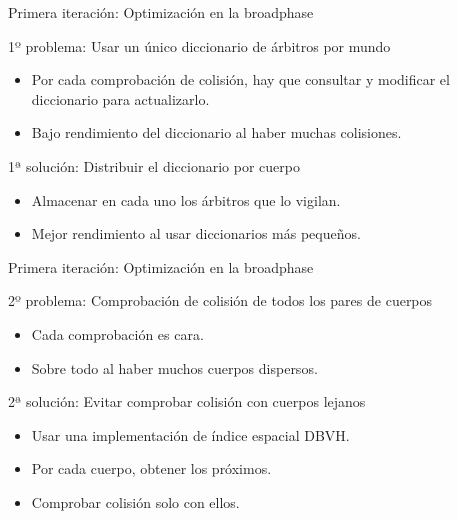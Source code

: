 \documentclass[10pt,xcolor=table]{beamer}
\begin{document}
\begin{frame}{Primera iteración: Optimización en la broadphase}

  \begin{block}{1º problema: Usar un único diccionario de árbitros por mundo}
    \begin{itemize}
    \item Por cada comprobación de colisión, hay que consultar y modificar el diccionario para actualizarlo.
    \item Bajo rendimiento del diccionario al haber muchas colisiones.
    \end{itemize}
  \end{block}

  \begin{exampleblock}{1ª solución: Distribuir el diccionario por cuerpo}
    \begin{itemize}
    \item Almacenar en cada uno los árbitros que lo vigilan.
    \item Mejor rendimiento al usar diccionarios más pequeños.
    \end{itemize}
  \end{exampleblock}
\end{frame}

\begin{frame}{Primera iteración: Optimización en la broadphase}

  \begin{block}{2º problema: Comprobación de colisión de todos los
      pares de cuerpos}
    \begin{itemize}
    \item Cada comprobación es cara.
    \item Sobre todo al haber muchos cuerpos dispersos.
    \end{itemize}
  \end{block}

  \begin{exampleblock}{2ª solución: Evitar comprobar colisión con cuerpos lejanos}
  \begin{itemize}
    \item Usar una implementación de índice espacial DBVH.
    \item Por cada cuerpo, obtener los próximos.
    \item Comprobar colisión solo con ellos.
    \end{itemize}
  \end{exampleblock}
\end{frame}
\end{document}
